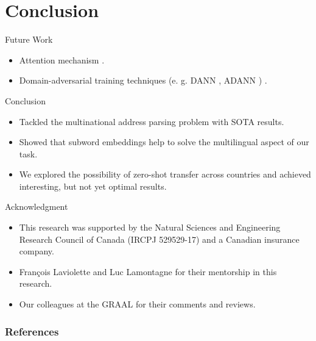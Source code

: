\documentclass{beamer}
\begin{document}
	\section{Conclusion}
	\begin{frame}{Future Work}
		\begin{itemize}
			\item<1-> Attention mechanism \cite{bahdanau2014neural}.
			\item<2-> Domain-adversarial training techniques (e. g. DANN \cite{ganin2015domainadversarial}, ADANN \cite{ADANN}) .
		\end{itemize}
	\end{frame}
	\begin{frame}{Conclusion}
		\begin{itemize}
			\item<1-> Tackled the multinational address parsing problem with SOTA results.
			\item<2-> Showed that subword embeddings help to solve the multilingual aspect of our task.
			\item<3-> We explored the possibility of zero-shot transfer across countries and achieved interesting, but not yet optimal results.
		\end{itemize}		
	\end{frame}

	\begin{frame}{Acknowledgment}
		\begin{itemize}
			\item This research was supported by the Natural Sciences and Engineering Research Council of Canada (IRCPJ 529529-17) and a Canadian insurance company. 
			\item François Laviolette and Luc Lamontagne for their mentorship in this research.
			\item Our colleagues at the GRAAL for their comments and reviews.
		\end{itemize}
	\end{frame}

	\begin{frame}[t, allowframebreaks]
		\frametitle{References}
		
		
	\end{frame}
		
	
\end{document}

